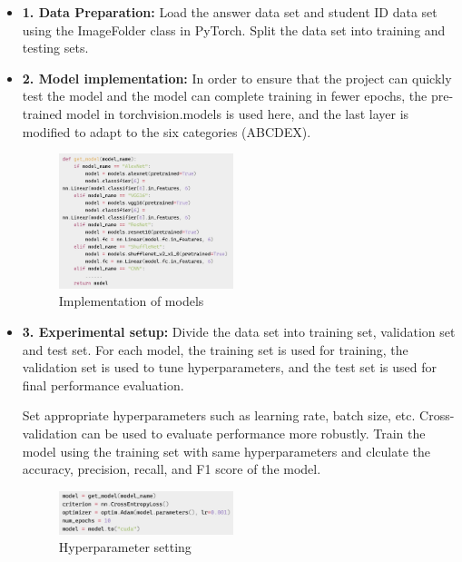 \documentclass[twocolumn]{article}
\begin{document}
        \begin{itemize}
            \item \textbf{1. Data Preparation:} Load the answer data set and student ID data set using the ImageFolder class in PyTorch. Split the data set into training and testing sets.
            
            \item \textbf{2. Model implementation:} In order to ensure that the project can quickly test the model and the model can complete training in fewer epochs, the pre-trained model in torchvision.models is used here, and the last layer is modified to adapt to the six categories (ABCDEX).
            
        \begin{figure}[ht]
            \centering
            \includegraphics[width=0.48\textwidth]{model_select.png}
            \caption{Implementation of models}
            \label{fig:model_select}
        \end{figure}

            \item \textbf{3. Experimental setup:} Divide the data set into training set, validation set and test set. For each model, the training set is used for training, the validation set is used to tune hyperparameters, and the test set is used for final performance evaluation.

            Set appropriate hyperparameters such as learning rate, batch size, etc. Cross-validation can be used to evaluate performance more robustly. Train the model using the training set with same hyperparameters and clculate the accuracy, precision, recall, and F1 score of the model. 

        \begin{figure}[ht]
            \centering
            \includegraphics[width=0.48\textwidth]{hyperparameter1.png}
            \caption{Hyperparameter setting}
            \label{fig:hyperparameter1}
        \end{figure}

        \end{itemize}
\end{document}

